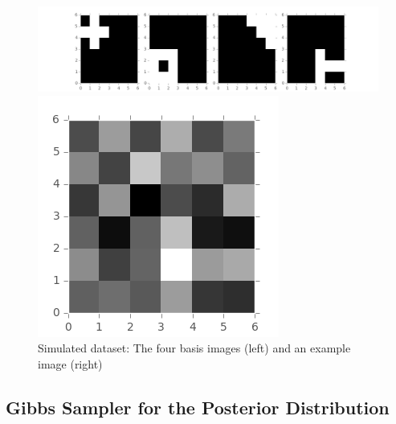 \begin{figure}[!ht]
\centering
    \begin{minipage}{0.8\linewidth}
    \includegraphics[width=\linewidth]{Version0_Wrong/basis_images.png}
    \end{minipage}%
    \begin{minipage}{0.2\linewidth}
    \includegraphics[width=\linewidth]{Version0_Wrong/example_image.png}
    \end{minipage}
    \caption{Simulated dataset: The four basis images (left) and an example image (right)}
    \label{fig:images}
\end{figure}

\subsection{Gibbs Sampler for the Posterior Distribution}

